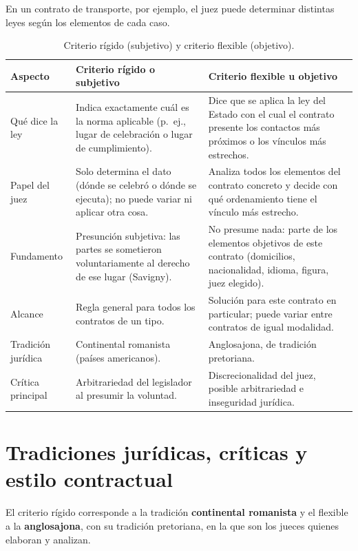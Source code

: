 \documentclass[12pt,oneside]{book}
\begin{document}
En un contrato de transporte, por ejemplo, el juez puede determinar distintas leyes según los elementos de cada caso.

\begin{table}[H]
\centering
\small
\caption{Criterio rígido (subjetivo) y criterio flexible (objetivo).}
\begin{tabularx}{\textwidth}{>{\raggedright\arraybackslash}p{} Y Y}
\toprule
\textbf{Aspecto} & \textbf{Criterio rígido o subjetivo} & \textbf{Criterio flexible u objetivo} \\
\midrule
Qué dice la ley & Indica exactamente cuál es la norma aplicable (p.\ ej., lugar de celebración o lugar de cumplimiento). & Dice que se aplica la ley del Estado con el cual el contrato presente los contactos más próximos o los vínculos más estrechos. \\
Papel del juez & Solo determina el dato (dónde se celebró o dónde se ejecuta); no puede variar ni aplicar otra cosa. & Analiza todos los elementos del contrato concreto y decide con qué ordenamiento tiene el vínculo más estrecho. \\
Fundamento & Presunción subjetiva: las partes se sometieron voluntariamente al derecho de ese lugar (Savigny). & No presume nada: parte de los elementos objetivos de este contrato (domicilios, nacionalidad, idioma, figura, juez elegido). \\
Alcance & Regla general para todos los contratos de un tipo. & Solución para este contrato en particular; puede variar entre contratos de igual modalidad. \\
Tradición jurídica & Continental romanista (países americanos). & Anglosajona, de tradición pretoriana. \\
Crítica principal & Arbitrariedad del legislador al presumir la voluntad. & Discrecionalidad del juez, posible arbitrariedad e inseguridad jurídica. \\
\bottomrule
\end{tabularx}
\end{table}

\section{Tradiciones jurídicas, críticas y estilo contractual}

El criterio rígido corresponde a la tradición \textbf{continental romanista} y el flexible a la \textbf{anglosajona}, con su tradición pretoriana, en la que son los jueces quienes elaboran y analizan.
\end{document}
